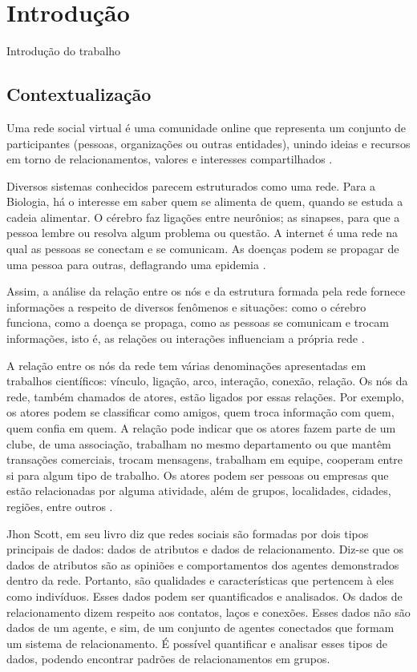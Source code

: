 \chapter[Introdução]{Introdução}

Introdução do trabalho

\section{Contextualização}

Uma rede social virtual é uma comunidade online que representa um conjunto de participantes (pessoas, organizações ou outras entidades), unindo ideias e recursos em torno de relacionamentos, valores e interesses compartilhados \cite{Marteleto:2001}.

Diversos sistemas conhecidos parecem estruturados como uma rede. Para a Biologia, há o interesse em saber quem se alimenta de quem, quando se estuda a cadeia alimentar. O cérebro faz ligações entre neurônios; as sinapses, para que a pessoa lembre ou resolva algum problema ou questão. A internet é uma rede na qual as pessoas se conectam e se comunicam. As doenças podem se propagar de uma pessoa para outras, deflagrando uma epidemia \cite{Goular:2014}.

Assim, a análise da relação entre os nós e da estrutura formada pela rede fornece informações a respeito de diversos fenômenos e situações: como o cérebro funciona, como a doença se propaga, como as pessoas se comunicam e trocam informações, isto é, as relações ou interações influenciam a própria rede \cite{Goular:2014}.

A relação entre os nós da rede tem várias denominações apresentadas em trabalhos científicos: vínculo, ligação, arco, interação, conexão, relação. Os nós da rede, também chamados de atores, estão ligados por essas relações. Por exemplo, os atores podem se classificar como amigos, quem troca informação com quem, quem confia em quem. A relação pode indicar que os atores fazem parte de um clube, de uma associação, trabalham no mesmo departamento ou que mantêm transações comerciais, trocam mensagens, trabalham em equipe, cooperam entre si para algum tipo de trabalho. Os atores podem ser pessoas ou empresas que estão relacionadas por alguma atividade, além de grupos, localidades, cidades, regiões, entre outros \cite{Hanneman:Riddle:2005}.

Jhon Scott, em seu livro \cite{Scott:Carrington:2011} diz que redes sociais são formadas por dois tipos principais de dados: dados de atributos e dados de relacionamento. Diz-se que os dados de atributos são as opiniões e comportamentos dos agentes demonstrados dentro da rede. Portanto, são qualidades e características que pertencem à eles como indivíduos. Esses dados podem ser quantificados e analisados. Os dados de relacionamento dizem respeito aos contatos, laços e conexões. Esses dados não são dados de um agente, e sim, de um conjunto de agentes conectados que formam um sistema de relacionamento. É possível quantificar e analisar esses tipos de dados, podendo encontrar padrões de relacionamentos em grupos.

